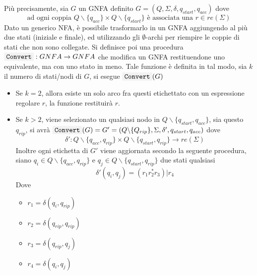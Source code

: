 \documentclass[10pt, letterpaper]{report}
\begin{document}
Più precisamente, sia $G$ un GNFA definito $G=(Q,\Sigma,\delta,q_{start},q_{acc})$ dove 
$$\text{ad ogni coppia } Q\backslash \{q_{acc}\} \times Q\backslash \{q_{start}\} \text{ è associata una } r\in re(\Sigma)$$
Dato un generico NFA, è possibile trasformarlo in un GNFA aggiungendo al più due stati (iniziale e 
finale), ed utilizzando gli $\emptyset$-archi per riempire le coppie di stati che non sono collegate.\acc 
Si definisce poi una procedura $\text{\code{Convert}} : GNFA \rightarrow GNFA$ che modifica un GNFA restituendone uno equivalente, ma con uno stato in meno. 
Tale funzione è definita in tal modo, sia $k$ il numero di stati/nodi di $G$, si esegue $\text{\code{Convert}}(G)$ \begin{itemize}
    \item Se $k=2$, allora esiste un solo arco fra questi etichettato con un espressione regolare $r$, la funzione 
    restituirà $r$. 
    \item Se $k> 2$, viene selezionato un qualsiasi nodo in $Q\backslash\{q_{start},q_{acc}\}$, sia questo $q_{rip}$, 
    si avrà $\text{\code{Convert}}(G)=G'=(Q\backslash\{Q_{rip}\},\Sigma,\delta',q_{start},q_{acc})$ dove 
    $$ \delta' : Q\backslash \{q_{acc},q_{rip}\} \times Q\backslash \{q_{start},q_{rip}\}\rightarrow re(\Sigma)$$
    Inoltre ogni etichetta di $G'$ viene aggiornata secondo la seguente procedura, siano $q_i\in Q\backslash \{q_{acc},q_{rip}\}$
    e  $q_j\in Q\backslash \{q_{start},q_{rip}\}$ due stati qualsiasi 
    $$ \delta'(q_i,q_j)=(r_1r_2^*r_3)|r_4$$
    Dove \begin{itemize}
        \item $r_1=\delta(q_i,q_{rip})$
        \item $r_2=\delta(q_{rip},q_{rip})$
        \item $r_3=\delta(q_{rip},q_j)$
        \item $r_4=\delta(q_i,q_j)$
    \end{itemize}
\end{itemize}
\begin{figure}[h!]
    \centering
\end{figure}
\end{document}
